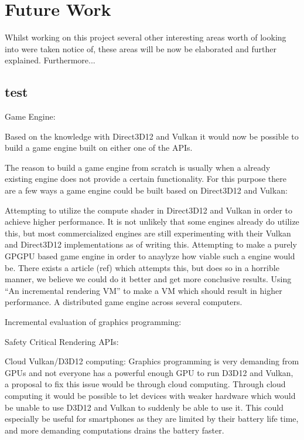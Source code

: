 \chapter{Future Work}\label{ch:future_work}
\begin{chaptermeta}
\end{chaptermeta}

Whilst working on this project several other interesting areas worth of looking into were taken notice of, these areas will be now be elaborated and further explained. Furthermore...





\section{test}


Game Engine:

Based on the knowledge with Direct3D12 and Vulkan it would now be possible to build a game engine built on either one of the \glspl{API}. 

The reason to build a game engine from scratch is usually when a already existing engine does not provide a certain functionality. For this purpose there are a few ways a game engine could be built based on Direct3D12 and Vulkan:

Attempting to utilize the compute shader in Direct3D12 and Vulkan in order to achieve higher performance. It is not unlikely that some engines already do utilize this, but most commercialized engines are still experimenting with their Vulkan and Direct3D12 implementations as of writing this.
Attempting to make a purely GPGPU based game engine in order to anaylyze how viable such a engine would be. There exists a article (ref) which attempts this, but does so in a horrible manner, we believe we could do it better and get more conclusive results. 
Using “An incremental rendering VM” to make a VM which should result in higher performance. 
A distributed game engine across several computers.

Incremental evaluation of graphics programming:

Safety Critical Rendering \glspl{API}: 

Cloud Vulkan/D3D12 computing: 
Graphics programming is very demanding from \glspl{GPU} and not everyone has a powerful enough \gls{GPU} to run D3D12 and Vulkan, a proposal to fix this issue would be through cloud computing. Through cloud computing it would be possible to let devices with weaker hardware which would be unable to use D3D12 and Vulkan to suddenly be able to use it. This could especially be useful for smartphones as they are limited by their battery life time, and more demanding computations drains the battery faster. 

